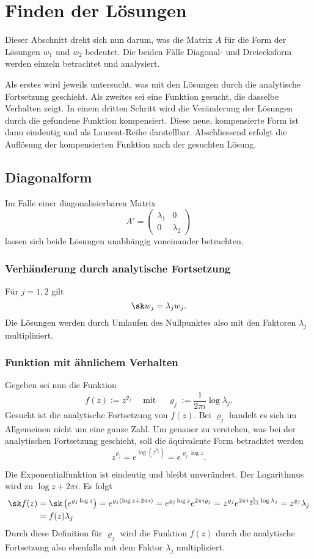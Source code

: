 \section{Finden der Lösungen}
Dieser Abschnitt dreht sich nun darum, was die Matrix $A$ für die Form der Lösungen $w_1$ und $w_2$ bedeutet. 
Die beiden Fälle Diagonal- und Dreiecksform werden einzeln betrachtet und analysiert.

Als erstes wird jeweils untersucht, was mit den Lösungen durch die analytische Fortsetzung geschieht.
Als zweites sei eine Funktion gesucht, die dasselbe Verhalten zeigt.
In einem dritten Schritt wird die Veränderung der Lösungen durch die gefundene Funktion kompensiert. Diese neue, kompensierte Form ist dann eindeutig und als Laurent-Reihe darstellbar.
Abschliessend erfolgt die Auflösung der kompensierten Funktion nach der gesuchten Lösung.

\subsection{Diagonalform}
Im Falle einer diagonalisierbaren Matrix 
\[A'=\begin{pmatrix}\lambda_1 & 0 \\ 0 & \lambda_2 \end{pmatrix}\]
lassen sich beide Lösungen unabhängig voneinander betrachten. 
\subsubsection{Verhänderung durch analytische Fortsetzung}
Für $j=1,2$ gilt
\[\sk w_j = \lambda_j w_j.\]
Die Lösungen werden durch Umlaufen des Nullpunktes also mit den Faktoren $\lambda_j$ multipliziert.

\subsubsection{Funktion mit ähnlichem Verhalten}
Gegeben sei nun die Funktion
\[f(z):=z^{\varrho_j} \quad\text{ mit }\quad \varrho_j := \frac{1}{2\pi i}\log \lambda_j.\]
Gesucht ist die analytische Fortsetzung von $f(z)$.
Bei $\varrho_j$ handelt es sich im Allgemeinen nicht um eine ganze Zahl.
Um genauer zu verstehen, was bei der analytischen Fortsetzung geschieht, soll die äquivalente Form betrachtet werden
\[z^{\varrho_j} = e^{\log(z^{\varrho_j})} = e^{\varrho_j \log z}.\]


Die Exponentialfunktion ist eindeutig und bleibt unverändert.
Der Logarithmus wird zu $\log z + 2\pi i$.
Es folgt
\begin{align*}
\sk f(z)
&= \sk \left(e^{\varrho_j \log z} \right) 
= e^{\varrho_j \left(\log z + 2\pi i\right)} 
= e^{\varrho_j \log z}  e^{2\pi i\varrho_j}
= z^{\varrho_j} e^{2\pi i\frac{1}{2\pi i}\log \lambda_j} 
= z^{\varrho_j} \lambda_j\\
&= f(z) \lambda_j
\end{align*}
Durch diese Definition für $\varrho_j$ wird die Funktion $f(z)$ durch die analytische Fortsetzung also ebenfalls mit dem Faktor $\lambda_j$ multipliziert. 

